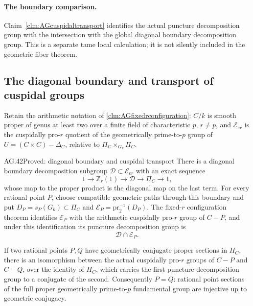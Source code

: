 \paragraph{The boundary comparison.}
Claim~\ref{clm:AGcuspidaltransport} identifies the actual
puncture decomposition group with the intersection with
the global diagonal boundary decomposition group. This
is a separate tame local calculation; it is not silently
included in the geometric fiber theorem.

\subsection{The diagonal boundary and transport of cuspidal groups}

Retain the arithmetic notation of
\ref{clm:AGfixedrconfiguration}: \(C/k\) is smooth proper
of genus at least two over a finite field of characteristic
\(p\), \(r\ne p\), and
\(\mathcal E_{\mathrm{c}r}\) is the cuspidally pro-\(r\)
quotient of the geometrically prime-to-\(p\) group of
\(U=(C\times C)-\Delta_C\), relative to
\(\Pi_C\times_{G_k}\Pi_C\).

\begin{claim}{AG.42}{Proved: diagonal boundary and cuspidal transport}
\label{clm:AGcuspidaltransport}
There is a diagonal boundary decomposition subgroup
\(\mathcal D\subset\mathcal E_{\mathrm{c}r}\) with
an exact sequence
\[
 1\longrightarrow\mathbb Z_r(1)\longrightarrow\mathcal D
 \longrightarrow\Pi_C\longrightarrow1,
                                                        \tag{AG.42.1}
\]
whose map to the proper product is the diagonal map on
the last term. For every rational point \(P\), choose
compatible geometric paths through this boundary and put
\(D_P=s_P(G_k)\subset\Pi_C\) and
\(\mathcal E_P=\mathrm{pr}_2^{-1}(D_P)\).
The fixed-\(r\) configuration theorem identifies
\(\mathcal E_P\) with the arithmetic cuspidally
pro-\(r\) group of \(C-P\), and under this
identification its puncture decomposition group is
\[
                           \mathcal D\cap\mathcal E_P.
                                                        \tag{AG.42.2}
\]

If two rational points \(P,Q\) have geometrically conjugate
proper sections in \(\Pi_C\), there is an isomorphism
between the actual cuspidally pro-\(r\) groups of
\(C-P\) and \(C-Q\), over the identity of
\(\Pi_C\), which carries the first puncture decomposition
group to a conjugate of the second. Consequently
\(P=Q\): rational point sections of the full proper
geometrically prime-to-\(p\) fundamental group are
injective up to geometric conjugacy.
\end{claim}

